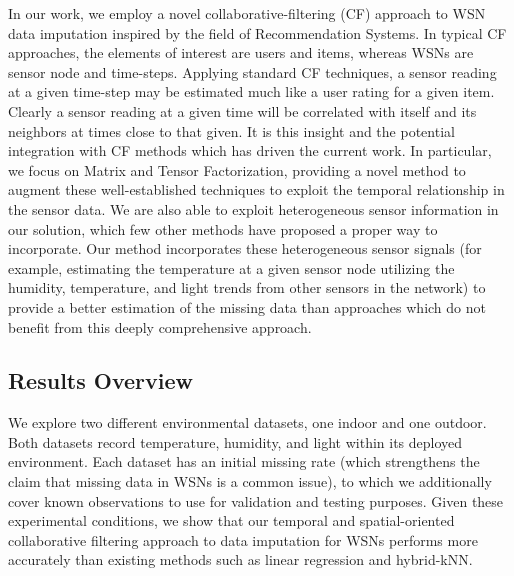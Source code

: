 In our work, we employ a novel collaborative-filtering (CF) approach to WSN data imputation inspired by the field of Recommendation Systems.
In typical CF approaches, the elements of interest are users and items, whereas WSNs are sensor node and time-steps.
Applying standard CF techniques, a sensor reading at a given time-step may be estimated much like a user rating for a given item.
Clearly a sensor reading at a given time will be correlated with itself and its neighbors at times close to that given.
It is this insight and the potential integration with CF methods which has driven the current work.
In particular, we focus on Matrix and Tensor Factorization, providing a novel method to augment these well-established techniques to exploit the temporal relationship in the sensor data.
We are also able to exploit heterogeneous sensor information in our solution, which few other methods have proposed a proper way to incorporate.
Our method incorporates these heterogeneous sensor signals (for example, estimating the temperature at a given sensor node utilizing the humidity, temperature, and light trends from other sensors in the network) to provide a better estimation of the missing data than approaches which do not benefit from this deeply comprehensive approach.

\subsection{Results Overview }
We explore two different environmental datasets, one indoor and one outdoor.
Both datasets record temperature, humidity, and light within its deployed environment.
Each dataset has an initial missing rate (which strengthens the claim that missing data in WSNs is a common issue), to which we additionally cover known observations to use for validation and testing purposes.
Given these experimental conditions, we show that our temporal and spatial-oriented collaborative filtering approach to data imputation for WSNs performs more accurately than existing methods such as linear regression and hybrid-kNN.



